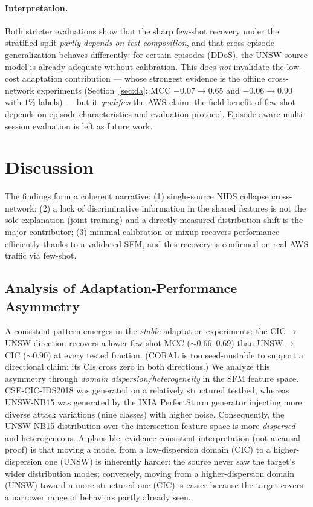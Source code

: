 \documentclass[preprint,12pt,authoryear]{elsarticle}
\begin{document}
\paragraph{Interpretation.} Both stricter evaluations show that the sharp few-shot
recovery under the stratified split \emph{partly depends on test composition}, and
that cross-episode generalization behaves differently: for certain episodes (DDoS),
the UNSW-source model is already adequate without calibration. This does \emph{not}
invalidate the low-cost adaptation contribution --- whose strongest evidence is the
offline cross-network experiments (Section~\ref{sec:da}: MCC $-0.07\to0.65$ and
$-0.06\to0.90$ with $1\%$ labels) --- but it \emph{qualifies} the AWS claim: the
field benefit of few-shot depends on episode characteristics and evaluation
protocol. Episode-aware multi-session evaluation is left as future work.

\FloatBarrier

\section{Discussion}
\label{sec:discussion}

The findings form a coherent narrative: (1) single-source NIDS collapse
cross-network; (2) a lack of discriminative information in the shared features is
not the sole explanation (joint training) and a directly measured distribution
shift is the major contributor;
(3) minimal calibration or mixup recovers performance efficiently thanks to a
validated SFM, and this recovery is confirmed on real AWS traffic via few-shot.

\subsection{Analysis of Adaptation-Performance Asymmetry}
\label{sec:asymmetry}
A consistent pattern emerges in the \emph{stable} adaptation experiments: the
CIC$\rightarrow$UNSW direction recovers a lower few-shot MCC ($\sim 0.66$--$0.69$)
than UNSW$\rightarrow$CIC ($\sim 0.90$) at every tested fraction. (CORAL is too
seed-unstable to support a directional claim: its CIs cross zero in both
directions.) We analyze this asymmetry through
\emph{domain dispersion/heterogeneity} in the SFM feature space.
CSE-CIC-IDS2018 was generated on a relatively structured testbed, whereas
UNSW-NB15 was generated by the IXIA PerfectStorm generator injecting more diverse
attack variations (nine classes) with higher noise. Consequently, the UNSW-NB15
distribution over the intersection feature space is more \emph{dispersed} and
heterogeneous. A plausible, evidence-consistent interpretation (not a causal proof)
is that moving a model from a low-dispersion domain (CIC) to a higher-dispersion one
(UNSW) is inherently harder: the source never saw the target's wider distribution
modes; conversely, moving from a higher-dispersion domain (UNSW) toward a more
structured one (CIC) is easier because the target covers a narrower range of
behaviors partly already seen.
\end{document}

